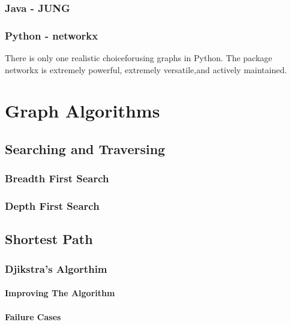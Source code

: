 \documentclass[10pt,a4paper]{book}
\begin{document}
\subsection{Java - JUNG}

\subsection{Python - networkx}

There is only one realistic choiceforusing graphs in Python.  The package networkx is extremely powerful, extremely versatile,and actively maintained.



\chapter{Graph Algorithms}

\section{Searching and Traversing}

\subsection{Breadth First Search}

\subsection{Depth First Search}




\section{Shortest Path}

\subsection{Djikstra's Algorthim}

\subsubsection{Improving The Algorithm}

\subsubsection{Failure Cases}
\end{document}
